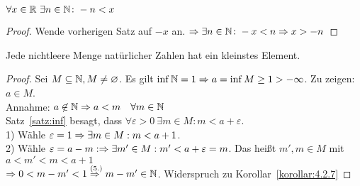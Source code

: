 \begin{korollar}
    $\forall x\in\mathbb{R}~\exists n\in\mathbb{N}\colon -n<x$
    \begin{proof}
        Wende vorherigen Satz auf $-x$ an. $\Rightarrow{} \exists n\in\mathbb{N}\colon -x < n \Rightarrow{} x > -n$
    \end{proof}
\end{korollar}

\begin{satz}
    Jede nichtleere Menge natürlicher Zahlen hat ein kleinstes Element.
    \begin{proof}
        Sei $M\subseteq \mathbb{N}, M\neq\varnothing$. Es gilt $\inf \mathbb{N} = 1 \Rightarrow{} a = \inf M \geq 1 > -\infty$. Zu zeigen: $a\in M$.\\
        Annahme: $a\not\in\mathbb{N} \Rightarrow{} a < m\quad\forall m \in\mathbb{N}$\\
        Satz~\ref{satz:inf} besagt, dass $\forall \varepsilon > 0~\exists m\in M: m<a+\varepsilon$.\\
        1) Wähle $\varepsilon = 1 \Rightarrow{} \exists m\in M: m< a + 1$.\\
        2) Wähle $\varepsilon = a -m: \Rightarrow{} \exists m'\in M: m'<a+\varepsilon =m$. Das heißt $m',m\in M$ mit $a<m'<m<a+1$\\
        $\Rightarrow{} 0 < m-m' < 1 \overset{\text{(5.)}}{\Rightarrow{}} m-m'\in\mathbb{N}$. Widerspruch zu Korollar~\ref{korollar:4.2.7}
    \end{proof}
\end{satz}

\newpage